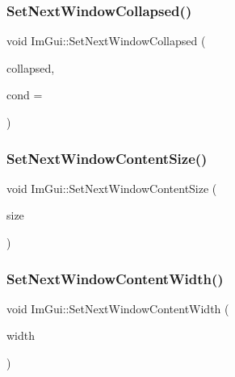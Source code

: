 \subsubsection{\texorpdfstring{Set\+Next\+Window\+Collapsed()}{SetNextWindowCollapsed()}}
{\footnotesize\ttfamily void Im\+Gui\+::\+Set\+Next\+Window\+Collapsed (\begin{DoxyParamCaption}\item[{bool}]{collapsed,  }\item[{Im\+Gui\+Cond}]{cond = {} }\end{DoxyParamCaption})}

\hypertarget{namespace_im_gui_aae55a58c38d8e84b10eb1e8b1531372d}{}\label{namespace_im_gui_aae55a58c38d8e84b10eb1e8b1531372d} 
\subsubsection{\texorpdfstring{Set\+Next\+Window\+Content\+Size()}{SetNextWindowContentSize()}}
{\footnotesize\ttfamily void Im\+Gui\+::\+Set\+Next\+Window\+Content\+Size (\begin{DoxyParamCaption}\item[{const \hyperlink{struct_im_vec2}{Im\+Vec2} \&}]{size }\end{DoxyParamCaption})}

\hypertarget{namespace_im_gui_a94731b8482ed9298a9ac454061e79e8a}{}\label{namespace_im_gui_a94731b8482ed9298a9ac454061e79e8a} 
\subsubsection{\texorpdfstring{Set\+Next\+Window\+Content\+Width()}{SetNextWindowContentWidth()}}
{\footnotesize\ttfamily void Im\+Gui\+::\+Set\+Next\+Window\+Content\+Width (\begin{DoxyParamCaption}\item[{float}]{width }\end{DoxyParamCaption})}

\hypertarget{namespace_im_gui_ac2d2b163c95cd8c8391aba85bc50d170}{}\label{namespace_im_gui_ac2d2b163c95cd8c8391aba85bc50d170} 
